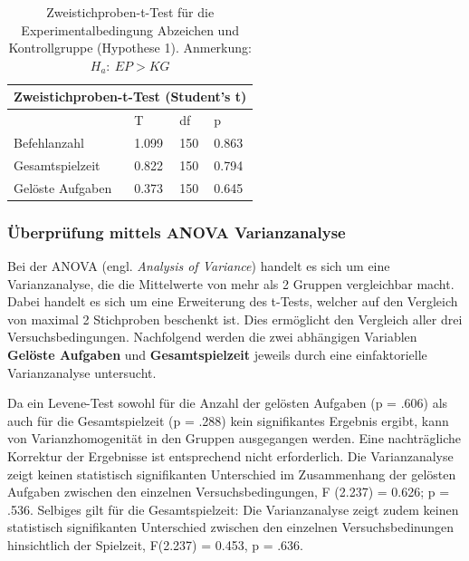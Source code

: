 \begin{table}[htbp]
\centering
\begin{tabular}{ |p{4cm}||p{2.0cm}|p{2.0cm}|p{2.0cm}| }
 \hline
 \multicolumn{4}{|c|}{Zweistichproben-t-Test (Student's t)} \\
 \hline
 & T &df & p \\
 \hline
  Befehlanzahl       & 1.099   &   150 & 0.863\\
  Gesamtspielzeit    & 0.822   &   150 & 0.794\\
  Gelöste Aufgaben   & 0.373   &   150 & 0.645\\
 \hline
\end{tabular}
\caption{Zweistichproben-t-Test für die Experimentalbedingung Abzeichen und Kontrollgruppe (Hypothese 1). Anmerkung: $H_a:\: EP > KG$}
\label{ttest_hypo_2}
\end{table}





\subsubsection{Überprüfung mittels ANOVA Varianzanalyse }
Bei der ANOVA (engl. \textit{Analysis of Variance}) handelt es sich um eine Varianzanalyse, die die Mittelwerte von mehr als 2 Gruppen vergleichbar macht. Dabei handelt es sich um eine Erweiterung des t-Tests, welcher auf den Vergleich von maximal 2 Stichproben beschenkt ist. Dies ermöglicht den Vergleich aller drei Versuchsbedingungen. Nachfolgend werden die zwei abhängigen Variablen \textbf{Gelöste Aufgaben} und \textbf{Gesamtspielzeit} jeweils durch eine einfaktorielle Varianzanalyse untersucht.

Da ein Levene-Test sowohl für die Anzahl der gelösten Aufgaben (p = .606) als auch für die Gesamtspielzeit (p = .288) kein signifikantes Ergebnis ergibt, kann von Varianzhomogenität in den Gruppen ausgegangen werden. Eine nachträgliche Korrektur der Ergebnisse ist entsprechend nicht erforderlich. Die Varianzanalyse zeigt keinen statistisch signifikanten Unterschied im Zusammenhang der gelösten Aufgaben zwischen den einzelnen Versuchsbedingungen, F (2.237) = 0.626; p = .536. Selbiges gilt für die Gesamtspielzeit: Die Varianzanalyse zeigt zudem keinen statistisch  signifikanten Unterschied zwischen den einzelnen Versuchsbedinungen hinsichtlich der Spielzeit,  F(2.237) = 0.453, p = .636.


